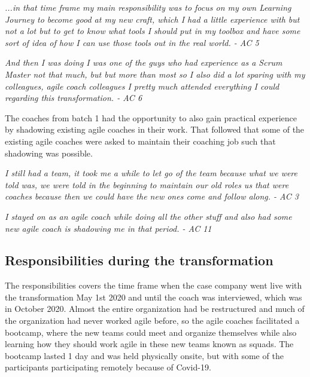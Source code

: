 \documentclass[11pt,a4paper]{report}
\begin{document}
\begin{displayquote}
\textit{
...in that time frame my main responsibility was to focus on my own Learning Journey to become good at my new craft, which I had a little experience with but not a lot but to get to know what tools I should put in my toolbox and have some sort of idea of how I can use those tools out in the real world. - AC 5
}
\end{displayquote}

\begin{displayquote}
\textit{
And then I was doing I was one of the guys who had experience as a Scrum Master not that much, but but more than most so I also did a lot sparing with my colleagues, agile coach colleagues I pretty much attended everything I could regarding this transformation. - AC 6
}
\end{displayquote}

\noindent The coaches from batch 1 had the opportunity to also gain practical experience by shadowing existing agile coaches in their work. That followed that some of the existing agile coaches were asked to maintain their coaching job such that shadowing was possible. 

\begin{displayquote}
\textit{
I still had a team, it took me a while to let go of the team because what we were told was, we were told in the beginning to maintain our old roles us that were coaches because then we could have the new ones come and follow along. - AC 3 
}
\end{displayquote}

\begin{displayquote}
\textit{
I stayed on as an agile coach while doing all the other stuff and also had some new agile coach is shadowing me in that period. - AC 11
}
\end{displayquote}

\subsection{Responsibilities during the transformation}
The responsibilities covers the time frame when the case company went live with the transformation May 1st 2020 and until the coach was interviewed, which was in October 2020. Almost the entire organization had be restructured and much of the organization had never worked agile before, so the agile coaches facilitated a bootcamp, where the new teams could meet and organize themselves while also learning how they should work agile in these new teams known as squads. The bootcamp lasted 1 day and was held physically onsite, but with some of the participants participating remotely because of Covid-19. 
\end{document}
